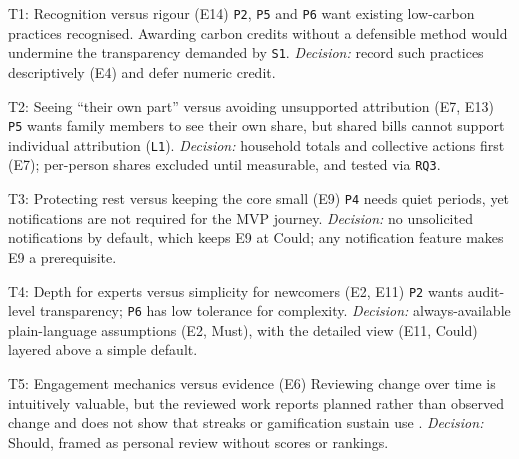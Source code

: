 \documentclass[12pt, a4paper]{article}
\begin{document}
\begin{tensioncard}{T1: Recognition versus rigour (E14)}
\texttt{P2}, \texttt{P5} and \texttt{P6} want existing low-carbon practices recognised. Awarding carbon credits without a defensible method would undermine the transparency demanded by \texttt{S1}. \emph{Decision:} record such practices descriptively (E4) and defer numeric credit.
\end{tensioncard}

\begin{tensioncard}{T2: Seeing ``their own part'' versus avoiding unsupported attribution (E7, E13)}
\texttt{P5} wants family members to see their own share, but shared bills cannot support individual attribution (\texttt{L1}). \emph{Decision:} household totals and collective actions first (E7); per-person shares excluded until measurable, and tested via \texttt{RQ3}.
\end{tensioncard}

\begin{tensioncard}{T3: Protecting rest versus keeping the core small (E9)}
\texttt{P4} needs quiet periods, yet notifications are not required for the MVP journey. \emph{Decision:} no unsolicited notifications by default, which keeps E9 at Could; any notification feature makes E9 a prerequisite.
\end{tensioncard}

\begin{tensioncard}{T4: Depth for experts versus simplicity for newcomers (E2, E11)}
\texttt{P2} wants audit-level transparency; \texttt{P6} has low tolerance for complexity. \emph{Decision:} always-available plain-language assumptions (E2, Must), with the detailed view (E11, Could) layered above a simple default.
\end{tensioncard}

\begin{tensioncard}{T5: Engagement mechanics versus evidence (E6)}
Reviewing change over time is intuitively valuable, but the reviewed work reports planned rather than observed change and does not show that streaks or gamification sustain use \cite{hoffmann2024, froehlich2010}. \emph{Decision:} Should, framed as personal review without scores or rankings.
\end{tensioncard}

\end{document}
